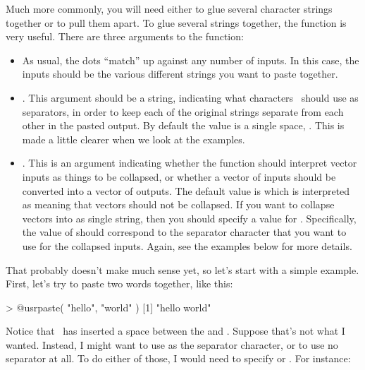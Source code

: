 Much more commonly, you will need either to glue several character strings together or to pull them apart. To glue several strings together, the  function is very useful. There are three arguments to the  function:
\begin{itemize} \itemsep 0pt
\item {}  As usual, the dots ``match'' up against any number of inputs. In this case, the inputs should be the various different strings you want to paste together.
\item {}. This argument should be a string, indicating what characters \R\ should use as separators, in order to keep each of the original strings separate from each other in the pasted output. By default the value is a single space, . This is made a little clearer when we look at the examples. 
\item {}. This is an argument indicating whether the  function should interpret vector inputs as things to be collapsed, or whether a vector of inputs should be converted into a vector of outputs. The default value is  which is interpreted as meaning that vectors should not be collapsed. If you want to collapse vectors into as single string, then you should specify a value for . Specifically, the value of  should correspond to the separator character that you want to use for the collapsed inputs. Again, see the examples below for more details. 
\end{itemize}
That probably doesn't make much sense yet, so let's start with a simple example. First, let's try to paste two words together, like this:
\begin{rblock1}
> @usr{paste( "hello", "world" )}
[1] "hello world"
\end{rblock1}
Notice that \R\ has inserted a space between the  and . Suppose that's not what I wanted. Instead, I might want to use  as the separator character, or to use no separator at all. To do either of those, I would need to specify  or . For instance:
